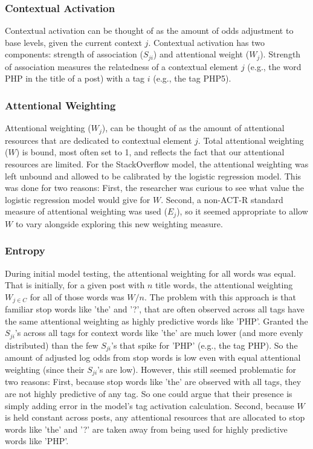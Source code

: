 \documentclass[10pt,letterpaper]{article}
\begin{document}
\subsubsection{Contextual Activation}

Contextual activation can be thought of as the amount of odds adjustment to base levels, given the current context $j$.
Contextual activation has two components: strength of association ($S_{ji}$) and attentional weight ($W_{j}$).
Strength of association measures the relatedness of a contextual element $j$ (e.g., the word PHP in the title of a post) with a tag $i$ (e.g., the tag PHP5).

\subsubsection{Attentional Weighting}

Attentional weighting ($W_{j}$), can be thought of as the amount of attentional resources that are dedicated to contextual element $j$.
Total attentional weighting ($W$) is bound, most often set to 1, and reflects the fact that our attentional resources are limited.
For the StackOverflow model, the attentional weighting was left unbound and allowed to be calibrated by the logistic regression model.
This was done for two reasons:
First, the researcher was curious to see what value the logistic regression model would give for $W$.
Second, a non-ACT-R standard measure of attentional weighting was used ($E_{j}$), so it seemed appropriate to allow $W$ to vary alongside exploring this new weighting measure. 

\subsubsection{Entropy}

During initial model testing, the attentional weighting for all words was equal.
That is initially, for a given post with $n$ title words, the attentional weighting $W_{j\in C}$ for all of those words was $W/n$.
The problem with this approach is that familiar stop words like 'the' and '?', that are often observed across all tags have the same attentional weighting as highly predictive words like 'PHP'.
Granted the $S_{ji}$'s across all tags for context words like 'the' are much lower (and more evenly distributed) than the few $S_{ji}$'s that spike for 'PHP' (e.g., the tag PHP).
So the amount of adjusted log odds from stop words is low even with equal attentional weighting (since their $S_{ji}$'s are low).
However, this still seemed problematic for two reasons:
First, because stop words like 'the' are observed with all tags, they are not highly predictive of any tag.
So one could argue that their presence is simply adding error in the model's tag activation calculation.
Second, because $W$ is held constant across posts, any attentional resources that are allocated to stop words like 'the' and '?' are taken away from being used for highly predictive words like 'PHP'.
\end{document}
